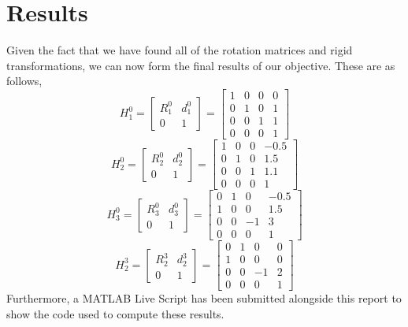 \documentclass[conference]{IEEEtran}
\begin{document}
\section{Results}
Given the fact that we have found all of the rotation matrices and
rigid transformations, we can now form the final results of
our objective. These are as follows,
\[
    H^0_1 = \begin{bmatrix}
        R^0_1 & d^0_1\\
        0 & 1
    \end{bmatrix}
    = \begin{bmatrix}
        1 & 0 & 0 & 0\\
        0 & 1 & 0 & 1\\
        0 & 0 & 1 & 1\\
        0 & 0 & 0 & 1
    \end{bmatrix}
\]
\[
    H^0_2 = \begin{bmatrix}
        R^0_2 & d^0_2\\
        0 & 1
    \end{bmatrix}
    = \begin{bmatrix}
        1 & 0 & 0 & -0.5\\
        0 & 1 & 0 & 1.5\\
        0 & 0 & 1 & 1.1\\
        0 & 0 & 0 & 1
    \end{bmatrix}
\]
\[
    H^0_3 = \begin{bmatrix}
        R^0_3 & d^0_3\\
        0 & 1
    \end{bmatrix}
    = \begin{bmatrix}
        0 & 1 & 0 & -0.5\\
        1 & 0 & 0 & 1.5\\
        0 & 0 & -1 & 3\\
        0 & 0 & 0 & 1
    \end{bmatrix}
\]
\[
    H^3_2 = \begin{bmatrix}
        R^3_2 & d^3_2\\
        0 & 1
    \end{bmatrix}
    = \begin{bmatrix}
        0 & 1 & 0 & 0\\
        1 & 0 & 0 & 0\\
        0 & 0 & -1 & 2\\
        0 & 0 & 0 & 1
    \end{bmatrix}
\]
Furthermore, a MATLAB Live Script has been submitted alongside
this report to show the code used to compute these results.
\end{document}
